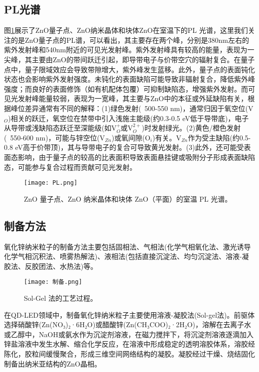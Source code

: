 \subsection{PL光谱}
图\ref{fig:PL}展示了ZnO量子点、ZnO纳米晶体和块体ZnO在室温下的PL 光谱，这里我们关注的是ZnO量子点的PL谱，可以看出，其主要存在两个峰，分别是380nm左右的紫外发射峰和540nm附近的可见光发射峰。紫外发射峰具有较高的能量，表现为一尖峰，其主要由ZnO的带间跃迁引起，即导带电子与价带空穴的辐射复合。在量子点中，量子限域效应会导致带隙增大，紫外峰发生蓝移。此外，量子点的表面钝化状态也会影响紫外发射强度。未钝化的表面缺陷可能导致非辐射复合，降低紫外峰强度；而良好的表面修饰（如有机配体包覆）可抑制缺陷态，增强紫外发射。而可见光发射峰能量较弱，表现为一宽峰，其主要与ZnO中的本征或外延缺陷有关，根据峰位差异通常有不同的解释：(1)绿色发射(~500-550 nm)，通常归因于氧空位(V$_O$)相关的跃迁，氧空位在禁带中引入浅施主能级(约0.3-0.5 eV低于导带底)，电子从导带或浅缺陷态跃迁至深能级(如V$_O^{+}$或V$_O^{2+}$)时发射绿光。(2)黄色/橙色发射(~550-600 nm)，可能与锌空位(V$_{Zn}$)或氧间隙(O$_i$)有关。V$_{Zn}$作为受主缺陷(约0.5-0.8 eV高于价带顶)，其与导带电子的复合可导致黄光发射。(3)此外，还可能受表面态影响，由于量子点的较高的比表面积导致表面悬挂键或吸附分子形成表面缺陷态，可能参与复合过程而贡献可见光发射。
\begin{figure}[ht]
	\centering
	\texttt{[image: PL.png]}
	\caption{ZnO 量子点、ZnO 纳米晶体和块体 ZnO（平面）的室温 PL 光谱\cite{PhysRevB.73.165317}。}
	\label{fig:PL}
\end{figure}
\subsection{制备方法}
氧化锌纳米粒子的制备方法主要包括固相法、气相法(化学气相氧化法、激光诱导化学气相沉积法、喷雾热解法)、液相法(包括直接沉淀法、均匀沉淀法、溶液-凝胶法、反胶团法、水热法)等\cite{GSYT200405013}。
\begin{figure}[ht]
	\centering
	\texttt{[image: 制备.png]}
	\caption{Sol-Gel 法的工艺过程\cite{HXGY200903022}。}
	\label{fig:SG}
\end{figure}

在QD-LED领域中，制备氧化锌纳米粒子主要使用溶液-凝胶法(Sol-gel法)。前驱体选择硝酸锌(Zn(NO₃)₂·6H₂O)或醋酸锌(Zn(CH₃COO)₂·2H₂O)，溶解在去离子水或乙醇中，NaOH或氨水作为沉淀剂溶液，在磁力搅拌下，将沉淀剂溶液逐滴加入锌盐溶液中发生水解、缩合化学反应，在溶液中形成稳定的透明溶胶体系，溶胶经陈化，胶粒间缓慢聚合，形成三维空间网络结构的凝胶。凝胶经过干燥、烧结固化制备出纳米亚结构的ZnO晶相。


